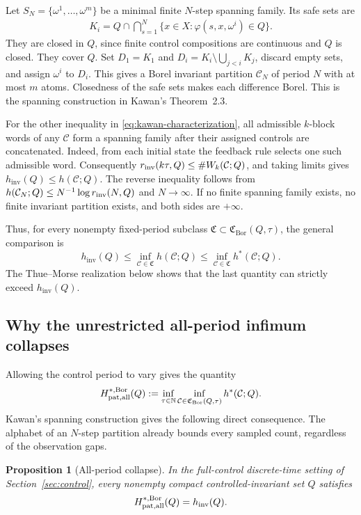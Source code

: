 \documentclass[11pt,reqno]{amsart}
\numberwithin{equation}{section}
\newtheorem{proposition}[theorem]{Proposition}
\theoremstyle{definition}
\theoremstyle{definition}
\newcommand{\N}{\mathbb N}
\newcommand{\C}{\mathcal C}
\newcommand{\hpat}{h^{*}}
\newcommand{\hinv}{h_{\mathrm{inv}}}
\newcommand{\Bor}{\mathrm{Bor}}
\begin{document}
Let $S_N=\{\omega^1,\ldots,\omega^m\}$ be a minimal finite
$N$-step spanning family. Its safe sets are
\begin{align*}
 K_i=Q\cap\bigcap_{s=1}^{N}
       \{x\in X:\varphi(s,x,\omega^i)\in Q\}.
\end{align*}
They are closed in $Q$, since finite control compositions are continuous
and $Q$ is closed. They cover $Q$. Set
$D_1=K_1$ and $D_i=K_i\setminus\bigcup_{j<i}K_j$, discard empty sets,
and assign $\omega^i$ to $D_i$. This gives a Borel invariant partition
$\C_N$ of period $N$ with at most $m$ atoms. Closedness of the safe sets makes each difference Borel. This is the
spanning construction in Kawan's Theorem~2.3.

For the other inequality in \eqref{eq:kawan-characterization}, all
admissible $k$-block words of any $\C$ form a spanning family after their
assigned controls are concatenated. Indeed, from each initial state the
feedback rule selects one such admissible word. Consequently
$r_{\rm inv}(k\tau,Q)\le\#W_k(\C;Q)$, and taking limits gives
$\hinv(Q)\le h(\C;Q)$. The reverse inequality follows from
$h(\C_N;Q)\le N^{-1}\log r_{\rm inv}(N,Q)$ and $N\to\infty$.
If no finite spanning family exists, no finite invariant partition exists,
and both sides are $+\infty$.

Thus, for every nonempty fixed-period subclass
$\mathfrak C\subset\mathfrak C_{\Bor}(Q,\tau)$, the general comparison is
\begin{equation}\label{eq:three-quantities}
 \hinv(Q)
 \le\inf_{\C\in\mathfrak C}h(\C;Q)
 \le\inf_{\C\in\mathfrak C}\hpat(\C;Q).
\end{equation}
The Thue--Morse realization below shows that the last quantity can
strictly exceed $\hinv(Q)$.

\subsection{Why the unrestricted all-period infimum collapses}
Allowing the control period to vary gives the quantity
\begin{align*}
 H_{\rm pat,all}^{*,\Bor}(Q)
 :=\inf_{\tau\in\N}\inf_{\C\in\mathfrak C_{\Bor}(Q,\tau)}
       \hpat(\C;Q).
\end{align*}
Kawan's spanning construction gives the following direct consequence.
The alphabet of an $N$-step partition already bounds every sampled
count, regardless of the observation gaps.

\begin{proposition}[All-period collapse]\label{prop:all-period-collapse}
In the full-control discrete-time setting of Section~\ref{sec:control}, every
nonempty compact controlled-invariant set $Q$ satisfies
\begin{equation}\label{eq:all-period-collapse}
 H_{\rm pat,all}^{*,\Bor}(Q)=\hinv(Q).
\end{equation}
\end{proposition}
\end{document}
